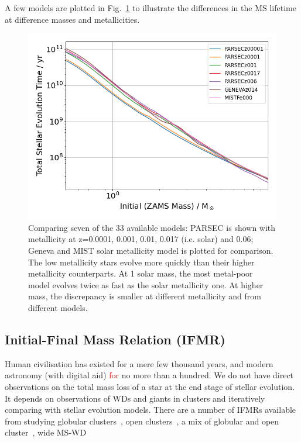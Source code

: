 \documentclass[fleqn,usenatbib]{rasti}
\begin{document}
A few models are plotted in Fig.~\ref{fig:total_stellar_lifetime} to
illustrate the differences in the MS lifetime at difference masses and
metallicities.

\begin{figure}
    \centering
    \includegraphics[width=\columnwidth]{fig_05_total_stellar_lifetime.png}
    \caption{Comparing seven of the 33 available models: PARSEC is shown with
    metallicity at z=0.0001, 0.001, 0.01, 0.017 (i.e. solar) and 0.06; Geneva
    and MIST solar metallicity model is plotted for comparison. The low
    metallicity stars evolve more quickly than their higher metallicity counterparts.
    At 1 solar mass, the most metal-poor model evolves twice as fast as the
    solar metallicity one. At higher mass, the discrepancy is smaller at
    different metallicity and from different models.}
    \label{fig:total_stellar_lifetime}
\end{figure}


\subsection{Initial-Final Mass Relation (IFMR)}
Human civilisation has existed for a mere few thousand years, and modern
astronomy (with digital aid) \textcolor{red}{for} no more than a hundred. We
do not have direct observations on the total mass loss of a star at the end
stage of stellar evolution. It depends on observations of WDs and giants in
clusters and iteratively comparing with stellar evolution models. There are a
number of IFMRs available from studying globular
clusters~\citep{2004A&A...420..515M, 2009ApJ...705..408K}, open
clusters~\citep{2009ApJ...693..355W, 2016ApJ...818...84C}, a mix of globular
and open cluster~\citep{2018ApJ...866...21C}, wide MS-WD
\end{document}
